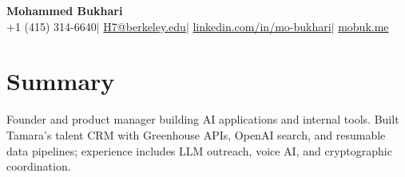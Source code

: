 \documentclass[a4paper,10pt]{article}
\begin{document}
\begin{center}
  {\LARGE\bfseries Mohammed Bukhari}\\[3pt]
  +1 (415) 314-6640\enspace$|$\enspace
  \href{mailto:H7@berkeley.edu}{H7@berkeley.edu}\enspace$|$\enspace
  \href{https://www.linkedin.com/in/mo-bukhari/}{linkedin.com/in/mo-bukhari}\enspace$|$\enspace
  \href{https://mobuk.me}{mobuk.me}
\end{center}
\vspace{-5pt}

\section{Summary}
Founder and product manager building AI applications and internal tools. Built Tamara's talent CRM with Greenhouse APIs, OpenAI search, and resumable data pipelines; experience includes LLM outreach, voice AI, and cryptographic coordination.
\end{document}
